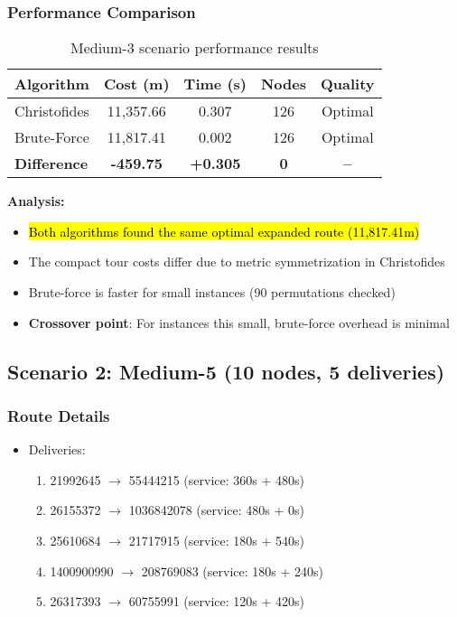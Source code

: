 \documentclass[9pt,a4paper,twoside]{tau}
\begin{document}
\subsubsection{Performance Comparison}

\begin{table}[h]
\centering
\begin{tabular}{@{}lcccc@{}}
\toprule
\textbf{Algorithm} & \textbf{Cost (m)} & \textbf{Time (s)} & \textbf{Nodes} & \textbf{Quality} \\
\midrule
Christofides & 11,357.66 & 0.307 & 126 & Optimal \\
Brute-Force & 11,817.41 & 0.002 & 126 & Optimal \\
\midrule
\textbf{Difference} & \textbf{-459.75} & \textbf{+0.305} & \textbf{0} & \textbf{--} \\
\bottomrule
\end{tabular}
\caption{Medium-3 scenario performance results}
\label{tab:medium3}
\end{table}

\textbf{Analysis:}
\begin{itemize}
    \item \hl{Both algorithms found the same optimal expanded route (11,817.41m)}
    \item The compact tour costs differ due to metric symmetrization in Christofides
    \item Brute-force is faster for small instances (90 permutations checked)
    \item \textbf{Crossover point}: For instances this small, brute-force overhead is minimal
\end{itemize}

\subsection{Scenario 2: Medium-5 (10 nodes, 5 deliveries)}

\subsubsection{Route Details}
\begin{itemize}
    \item Deliveries:
    \begin{enumerate}
        \item 21992645 $\to$ 55444215 (service: 360s + 480s)
        \item 26155372 $\to$ 1036842078 (service: 480s + 0s)
        \item 25610684 $\to$ 21717915 (service: 180s + 540s)
        \item 1400900990 $\to$ 208769083 (service: 180s + 240s)
        \item 26317393 $\to$ 60755991 (service: 120s + 420s)
    \end{enumerate}
\end{itemize}
\end{document}
